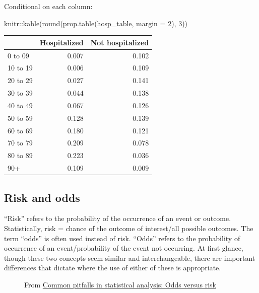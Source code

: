 \documentclass[
  openany]{book}
\newenvironment{Shaded}{\begin{snugshade}}{\end{snugshade}}
\newcommand{\AttributeTok}[1]{\textcolor[rgb]{0.77,0.63,0.00}{#1}}
\newcommand{\DecValTok}[1]{\textcolor[rgb]{0.00,0.00,0.81}{#1}}
\newcommand{\FunctionTok}[1]{\textcolor[rgb]{0.00,0.00,0.00}{#1}}
\newcommand{\NormalTok}[1]{#1}
\newcommand{\SpecialCharTok}[1]{\textcolor[rgb]{0.00,0.00,0.00}{#1}}
\begin{document}
Conditional on each column:

\begin{Shaded}
\begin{Highlighting}[]
\NormalTok{knitr}\SpecialCharTok{::}\FunctionTok{kable}\NormalTok{(}\FunctionTok{round}\NormalTok{(}\FunctionTok{prop.table}\NormalTok{(hosp\_table, }\AttributeTok{margin =} \DecValTok{2}\NormalTok{), }\DecValTok{3}\NormalTok{))}
\end{Highlighting}
\end{Shaded}

\begin{tabular}{l|r|r}
\hline
  & Hospitalized & Not hospitalized\\
\hline
0 to 09 & 0.007 & 0.102\\
\hline
10 to 19 & 0.006 & 0.109\\
\hline
20 to 29 & 0.027 & 0.141\\
\hline
30 to 39 & 0.044 & 0.138\\
\hline
40 to 49 & 0.067 & 0.126\\
\hline
50 to 59 & 0.128 & 0.139\\
\hline
60 to 69 & 0.180 & 0.121\\
\hline
70 to 79 & 0.209 & 0.078\\
\hline
80 to 89 & 0.223 & 0.036\\
\hline
90+ & 0.109 & 0.009\\
\hline
\end{tabular}

\hypertarget{risk-and-odds}{%
\subsection{Risk and odds}\label{risk-and-odds}}

\begin{description}
\item[``Risk'' refers to the probability of the occurrence of an event or outcome. Statistically, risk = chance of the outcome of interest/all possible outcomes. The term ``odds'' is often used instead of risk. ``Odds'' refers to the probability of occurrence of an event/probability of the event not occurring. At first glance, though these two concepts seem similar and interchangeable, there are important differences that dictate where the use of either of these is appropriate.]
From \href{https://www.ncbi.nlm.nih.gov/pmc/articles/PMC4640017/}{Common pitfalls in statistical analysis: Odds versus
risk}
\end{description}
\end{document}
